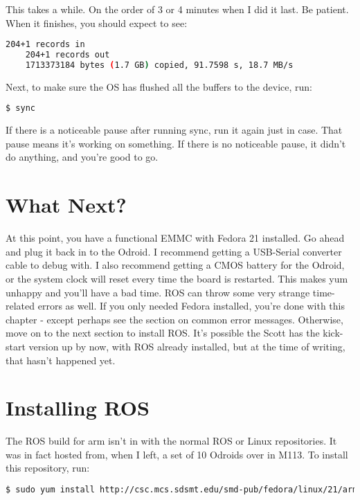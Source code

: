 This takes a while. On the order of 3 or 4 minutes when I did it last. Be patient. When it finishes, you should expect to see:
\begin{lstlisting}[language=bash]
    204+1 records in
	204+1 records out
	1713373184 bytes (1.7 GB) copied, 91.7598 s, 18.7 MB/s
\end{lstlisting}

Next, to make sure the OS has flushed all the buffers to the device, run:

\begin{lstlisting}[language=bash]
  $ sync
\end{lstlisting}

If there is a noticeable pause after running sync, run it again just in case. That pause means it's working on something. If there is no noticeable pause, it didn't do anything, and you're good to go.

\section{What Next?}

At this point, you have a functional EMMC with Fedora 21 installed. Go ahead and plug it back in to the Odroid. I recommend getting a USB-Serial converter cable to debug with. I also recommend getting a CMOS battery for the Odroid, or the system clock will reset every time the board is restarted. This makes yum unhappy and you'll have a bad time. ROS can throw some very strange time-related errors as well. If you only needed Fedora installed, you're done with this chapter - except perhaps see the section on common error messages. Otherwise, move on to the next section to install ROS. It's possible the Scott has the kick-start version up by now, with ROS already installed, but at the time of writing, that hasn't happened yet.

\section{Installing ROS}

The ROS build for arm isn't in with the normal ROS or Linux repositories. It was in fact hosted from, when I left, a set of 10 Odroids over in M113. To install this repository, run:

\begin{lstlisting}[language=bash]
  $ sudo yum install http://csc.mcs.sdsmt.edu/smd-pub/fedora/linux/21/armhfp/smd-ros-release-21-2.noarch.rpm
\end{lstlisting}

